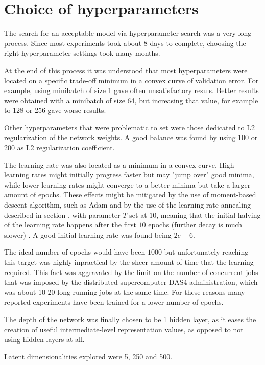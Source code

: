 \section{Choice of hyperparameters}

The search for an acceptable model via hyperparameter search was a very long process.
Since most experiments took about 8 days to complete, choosing the right hyperparameter
settings took many months.

At the end of this process it was understood that most hyperparameters were located
on a specific trade-off minimum in a convex curve of validation error.
For example, using minibatch of size 1 gave
often unsatisfactory resuls. Better results were obtained with a minibatch of size 64,
but increasing that value, for example to 128 or 256 gave worse results.

Other hyperparameters that were problematic to set were those dedicated to 
L2 regularization of the network weights. A good balance was found by using 100 or 200 
as L2 regularization coefficient.

The learning rate was also located as a minimum in a convex curve.
High learning rates might initially progress faster but may "jump over" good minima,
while lower learning rates might converge to a better minima but take a larger amount of
epochs. These effects might be mitigated by the use of moment-based descent algorithm,
such as
Adam \cite{KingmaB14} and by the use of 
the learning rate annealing described in section \cite{annealing}, with
parameter $T$ set at $10$, meaning that the initial halving of the learning rate
happens after the first $10$ epochs (further decay is much slower)
. A good initial learning rate was found being $2e-6$.

The ideal number of epochs would have been $1000$ but unfortunately reaching
this target was highly inpractical by the sheer amount of time that the learning
required. This fact was aggravated by the limit on the number of concurrent
jobs that was imposed by the distributed supercomputer DAS4 administration,
which was about 10-20 long-running jobs at the same time.
For these reasons many reported experiments have been trained for a lower number of
epochs.

The depth of the network was finally chosen to be 1 hidden layer,
as it eases the creation of useful intermediate-level
representation values, as opposed to not using hidden layers at all.

Latent dimensionalities explored were 5, 250 and 500. 



